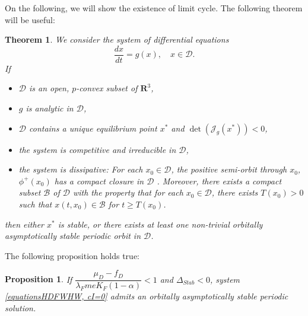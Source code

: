 \documentclass{article}
\newcommand{\lfw}{\lambda_{F}}
\newcommand{\lfw}{\lambda_{F}}
\newtheorem{theorem}{Theorem}
\newtheorem{prop}{Proposition}
\begin{document}
On the following, we will show the existence of limit cycle. The following theorem will be useful:

\begin{theorem}\cite{zhu_stable_1994}\label{periodicASOrbit}
We consider the system of differential equations
$$
\dfrac{dx}{dt} = g(x), \quad x \in \mathcal{D}.
$$
If
\begin{itemize}
\item $\mathcal{D}$ is an open, $p$-convex subset of $\mathbf{R}^3$,
\item $g$ is analytic in $\mathcal{D}$,
\item $\mathcal{D}$ contains a unique equilibrium point $x^*$ and $\det(\mathcal{J}_g(x^*)) < 0$,
\item the system is competitive and irreducible in $\mathcal{D}$,
\item the system is dissipative: For each $x_0 \in \mathcal{D}$, the positive semi-orbit through $x_0$, $\phi^+(x_0)$ has a compact closure in $\mathcal{D}$ . Moreover, there exists a compact subset $\mathcal{B}$ of $\mathcal{D}$ with the property that for each $x_0 \in \mathcal{D}$, there exists $T(x_0) > 0$ such that $x(t, x_0) \in \mathcal{B}$ for $t \geq T(x_0)$.
\end{itemize}

then either $x^*$ is stable, or there exists at least one non-trivial orbitally asymptotically stable  periodic orbit in $\mathcal{D}$.
\end{theorem}

The following proposition holds true:

\begin{prop}\label{LimitCycle, cI=0}
If $\dfrac{\mu_D - f_D}{\lfw m e K_F(1-\alpha)} < 1$ and $\Delta_{Stab} < 0$, system \eqref{equationsHDFWHW, cI=0} admits an orbitally asymptotically stable periodic solution.
\end{prop}
\end{document}
